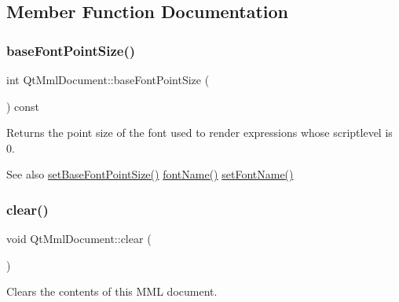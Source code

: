 \subsection{Member Function Documentation}
\mbox{\label{class_qt_mml_document_a6988266de54f91cdc03e3d20915828c1}} 
\subsubsection{\texorpdfstring{base\+Font\+Point\+Size()}{baseFontPointSize()}}
{\footnotesize\ttfamily int Qt\+Mml\+Document\+::base\+Font\+Point\+Size (\begin{DoxyParamCaption}{ }\end{DoxyParamCaption}) const}

Returns the point size of the font used to render expressions whose scriptlevel is 0.

\begin{DoxySeeAlso}{See also}
\mbox{\hyperlink{class_qt_mml_document_aedb2bedfbc96f3fb41cd04ecf3f327f2}{set\+Base\+Font\+Point\+Size()}} \mbox{\hyperlink{class_qt_mml_document_aee262410ce903f2a58c1eac22311266a}{font\+Name()}} \mbox{\hyperlink{class_qt_mml_document_a6e722bc5c964444616ef4d9e640d9350}{set\+Font\+Name()}} 
\end{DoxySeeAlso}
\mbox{\label{class_qt_mml_document_add5a21595194288f647e020f36448587}} 
\subsubsection{\texorpdfstring{clear()}{clear()}}
{\footnotesize\ttfamily void Qt\+Mml\+Document\+::clear (\begin{DoxyParamCaption}{ }\end{DoxyParamCaption})}

Clears the contents of this M\+ML document. \mbox{\label{class_qt_mml_document_aee262410ce903f2a58c1eac22311266a}} 
